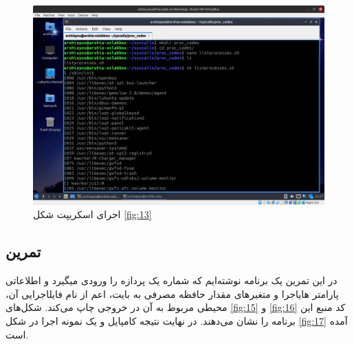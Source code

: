 \documentclass[12pt]{article}
\begin{document}
	\begin{figure}[H]
		\centering
		\includegraphics[width=\textwidth]{report3-resources/15.png}
		\caption{اجرای اسکریپت شکل \ref{fig:13}}
		\label{fig:14}
	\end{figure}
	
	\subsection{تمرین}
	در این تمرین یک برنامه نوشته‌ایم که شماره یک پردازه را ورودی میگیرد و ‫اطلاعاتی‬ ‫اعم‬ ‫از‬ ‫نام‬
	‫فایل‬‫اجرایی‬ ‫آن‪،‬‬ ‫مقدار‬ ‫حافظه‬ ‫مصرفی‬ ‫به‬ ‫بایت‪،‬‬ ‫پارامتر‬ ‫های‬‫اجرا‬ ‫و‬ ‫متغیرهای‬ ‫محیطی‬ ‫مربوط‬ ‫به‬ ‫آن‬ ‫در‬ ‫خروجی‬ ‫چاپ‬ می‌کند. شکل‌های ‬‬\ref{fig:15} و \ref{fig:16} کد منبع این برنامه را نشان می‌دهند. در نهایت نتیجه کامپایل و یک نمونه اجرا در شکل \ref{fig:17} آمده است.
	
\end{document}
